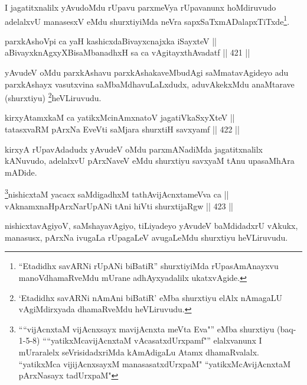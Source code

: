 \begin{artha}
I jagatitxnalilx yAvudoMdu rUpavu parxmeVya rUpavanunx hoMdiruvudo
adelalxvU manasesxV eMdu shurxtiyiMda neVra sapxSaTxmADalapxTiTxde\footnote{``Etadidhx savARNi rUpANi biBatiR'' shurxtiyiMda rUpasAmAnayxvu manoVdhamaRveMdu mUrane adhAyxyadalilx ukatxvAgide.}.
\end{artha}

\begin{shl}
parxkAshoV\s pi ca yaH kashicxdaBivayxcnajxka iSayxteV || \\
aBivayxknAgxyXBisaMbanadhxH sa ca vAgitayxthAvadatf \hfill || 421 ||  
\end{shl}

\begin{artha}
yAvudeV oMdu parxkAshavu parxkAshakaveMbudAgi saMmatavAgideyo adu
parxkAshayx vasutxvina saMbaMdhavuLaLxdudx, aduvAkekxMdu anaMtarave
(shurxtiyu) \footnote{`Etadidhx savARNi nAmAni biBatiR' eMba shurxtiyu elAlx nAmagaLU
vAgiMdirxyada dhamaRveMdu heVLiruvudu.}heVLiruvudu.
\end{artha}

\begin{shl}
kirxyAtamxkaM ca yatikxMcinAmxnatoV jagatiVkaSxyXteV || \\
tatasxvaRM pArxNa EveVti saMjara shurxtiH savxyamf \hfill || 422 ||  
\end{shl}

\begin{artha}
kirxyA rUpavAdadudx yAvudeV oMdu parxmANadiMda jagatitxnalilx
kANuvudo, adelalxvU pArxNaveV eMdu shurxtiyu savxyaM tAnu upasaMhAra
mADide.
\end{artha}


\begin{shl}
\footnote{````vijAcnxtaM vijAcnxsayx mavijAcnxta meVta Eva"'' eMba shurxtiyu (baq-1-5-8) ````yatikxMcavijAcnxtaM vAcasatxdUrxpamf"'' elalxvanunx I mUraralelx seVrisidadxriMda kAmAdigaLu Atamx dhamaRvalalx. ``yatikxMca vijijAcnxsayxM manasasatxdUrxpaM" ``yatikxMcAvijAcnxtaM pArxNasayx tadUrxpaM"}nishicxtaM yacacx saMdigadhxM tathA\s vijAcnxtameVva ca || \\
vAknamxnaHpArxNarUpANi tAni hiVti shurxtijaRgw \hfill || 423 ||  
\end{shl}

\begin{artha}
nishicxtavAgiyoV, saMshayavAgiyo, tiLiyadeyo yAvudeV baMdidadxrU vAkukx, manasusx, pArxNa ivugaLa rUpagaLeV avugaLeMdu shurxtiyu heVLiruvudu.
\end{artha}

